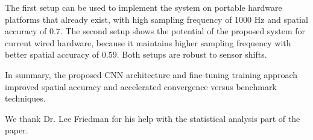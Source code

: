 The first setup can be used to implement the system on portable hardware platforms that already exist, with high sampling frequency of 1000 Hz and spatial accuracy of $0.7$\textdegree{}.
The second setup shows the potential of the proposed system for current wired hardware, because it maintains higher sampling frequency with better spatial accuracy of $0.59$\textdegree{}. Both setups are robust to sensor shifts. 

In summary, the proposed CNN architecture and fine-tuning training approach improved spatial accuracy and accelerated convergence versus benchmark techniques.

\begin{acks}

We thank Dr. Lee Friedman for his help with the statistical analysis part of the paper. 

\end{acks}